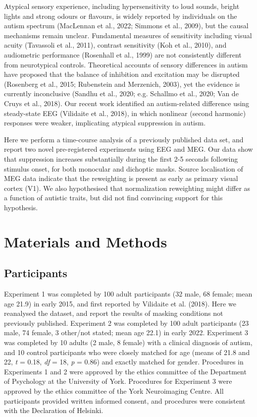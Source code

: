 \documentclass[
]{article}
\begin{document}
Atypical sensory experience, including hypersensitivity to loud sounds, bright lights and strong odours or flavours, is widely reported by individuals on the autism spectrum (MacLennan et al., 2022; Simmons et al., 2009), but the causal mechanisms remain unclear. Fundamental measures of sensitivity including visual acuity (Tavassoli et al., 2011), contrast sensitivity (Koh et al., 2010), and audiometric performance (Rosenhall et al., 1999) are not consistently different from neurotypical controls. Theoretical accounts of sensory differences in autism have proposed that the balance of inhibition and excitation may be disrupted (Rosenberg et al., 2015; Rubenstein and Merzenich, 2003), yet the evidence is currently inconclusive (Sandhu et al., 2020; e.g. Schallmo et al., 2020; Van de Cruys et al., 2018). Our recent work identified an autism-related difference using steady-state EEG (Vilidaite et al., 2018), in which nonlinear (second harmonic) responses were weaker, implicating atypical suppression in autism.

Here we perform a time-course analysis of a previously published data set, and report two novel pre-registered experiments using EEG and MEG. Our data show that suppression increases substantially during the first 2-5 seconds following stimulus onset, for both monocular and dichoptic masks. Source localisation of MEG data indicate that the reweighting is present as early as primary visual cortex (V1). We also hypothesised that normalization reweighting might differ as a function of autistic traits, but did not find convincing support for this hypothesis.

\hypertarget{materials-and-methods}{%
\section{Materials and Methods}\label{materials-and-methods}}

\hypertarget{participants}{%
\subsection{Participants}\label{participants}}

Experiment 1 was completed by 100 adult participants (32 male, 68 female; mean age 21.9) in early 2015, and first reported by Vilidaite et al. (2018). Here we reanalysed the dataset, and report the results of masking conditions not previously published. Experiment 2 was completed by 100 adult participants (23 male, 74 female, 3 other/not stated; mean age 22.1) in early 2022. Experiment 3 was completed by 10 adults (2 male, 8 female) with a clinical diagnosis of autism, and 10 control participants who were closely matched for age (means of 21.8 and 22, \emph{t} = 0.18, \emph{df} = 18, \emph{p} = 0.86) and exactly matched for gender. Procedures in Experiments 1 and 2 were approved by the ethics committee of the Department of Psychology at the University of York. Procedures for Experiment 3 were approved by the ethics committee of the York Neuroimaging Centre. All participants provided written informed consent, and procedures were consistent with the Declaration of Helsinki.
\end{document}

